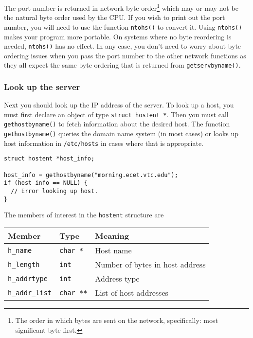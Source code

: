 \documentclass{article}
\newcommand{\filename}[1]{\texttt{#1}}
\begin{document}
The port number is returned in network byte order\footnote{The order in which bytes are sent on the network, specifically: most significant byte first.} which may or may not be the natural byte order used by the CPU. If you wish to print out the port number, you will need to use the function \texttt{ntohs()} to convert it. Using \texttt{ntohs()} makes your program more portable. On systems where no byte reordering is needed, \texttt{ntohs()} has no effect. In any case, you don't need to worry about byte ordering issues when you pass the port number to the other network functions as they all expect the same byte ordering that is returned from \texttt{getservbyname()}.

\subsubsection{Look up the server}

Next you should look up the IP address of the server. To look up a host, you must first declare an object of type \texttt{struct hostent *}. Then you must call \texttt{gethostbyname()} to fetch information about the desired host. The function \texttt{gethostbyname()} queries the domain name system (in most cases) or looks up host information in \filename{/etc/hosts} in cases where that is appropriate.

\begin{verbatim}
struct hostent *host_info;

host_info = gethostbyname("morning.ecet.vtc.edu");
if (host_info == NULL) {
  // Error looking up host.
}
\end{verbatim}

The members of interest in the \texttt{hostent} structure are

\begin{tabular}{|l|l|l|} \hline
Member                 & Type             & Meaning                        \\ \hline \hline
\texttt{h\_name}       & \texttt{char *}  & Host name                      \\ \hline
\texttt{h\_length}     & \texttt{int}     & Number of bytes in host address\\ \hline
\texttt{h\_addrtype}   & \texttt{int}     & Address type                   \\ \hline
\texttt{h\_addr\_list} & \texttt{char **} & List of host addresses         \\ \hline
\end{tabular}
\end{document}
